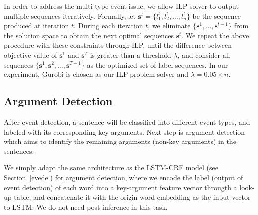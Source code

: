 In order to address the multi-type event issue, we allow ILP solver to output multiple sequences iteratively. Formally, let $\bm{s}^t=\{l_1^t, l_2^t, \ldots, l_n^t\}$ be the sequence produced at iteration $t$. During each iteration $t$, we eliminate $\{\bm{s}^1, \ldots, \bm{s}^{t-1}\}$ from the solution space to obtain the next optimal sequences $\bm{s}^t$. We repeat the above procedure with these constraints through ILP, until the difference between objective value of $\bm{s}^1$ and $\bm{s}^T$ is greater than a threshold $\lambda$, and consider all sequences $\{\bm{s}^1, \bm{s}^2, \ldots, \bm{s}^{T-1}\}$ as the optimized set of label sequences. In our experiment, Gurobi \cite{gurobi} is chosen as our ILP problem solver and $\lambda=0.05 \times n$.

\subsection{Argument Detection}
After event detection, a sentence will be classified into different event types, and labeled with its corresponding key arguments. Next step is argument detection which aims to identify the remaining arguments (non-key arguments) in the sentences.  

We simply adapt the same architecture as the LSTM-CRF model (see Section~\ref{evede}) for argument detection, where we encode the label (output of event detection) of each word into a key-argument feature vector througth a look-up table, and concatenate it with the origin word embedding as the input vector to LSTM. We do not need post inference in this task.
